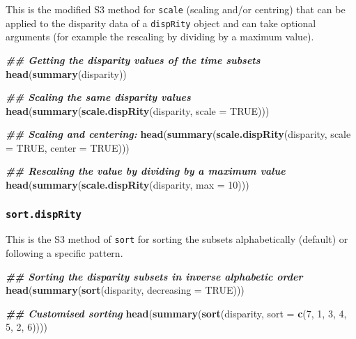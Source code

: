 \documentclass[
]{book}
\newenvironment{Shaded}{\begin{snugshade}}{\end{snugshade}}
\newcommand{\AttributeTok}[1]{\textcolor[rgb]{0.13,0.29,0.53}{#1}}
\newcommand{\ConstantTok}[1]{\textcolor[rgb]{0.56,0.35,0.01}{#1}}
\newcommand{\DecValTok}[1]{\textcolor[rgb]{0.00,0.00,0.81}{#1}}
\newcommand{\DocumentationTok}[1]{\textcolor[rgb]{0.56,0.35,0.01}{\textbf{\textit{#1}}}}
\newcommand{\FunctionTok}[1]{\textcolor[rgb]{0.13,0.29,0.53}{\textbf{#1}}}
\newcommand{\NormalTok}[1]{#1}
\begin{document}
This is the modified S3 method for \texttt{scale} (scaling and/or centring) that can be applied to the disparity data of a \texttt{dispRity} object and can take optional arguments (for example the rescaling by dividing by a maximum value).

\begin{Shaded}
\begin{Highlighting}[]
\DocumentationTok{\#\# Getting the disparity values of the time subsets}
\FunctionTok{head}\NormalTok{(}\FunctionTok{summary}\NormalTok{(disparity))}

\DocumentationTok{\#\# Scaling the same disparity values}
\FunctionTok{head}\NormalTok{(}\FunctionTok{summary}\NormalTok{(}\FunctionTok{scale.dispRity}\NormalTok{(disparity, }\AttributeTok{scale =} \ConstantTok{TRUE}\NormalTok{)))}

\DocumentationTok{\#\# Scaling and centering:}
\FunctionTok{head}\NormalTok{(}\FunctionTok{summary}\NormalTok{(}\FunctionTok{scale.dispRity}\NormalTok{(disparity, }\AttributeTok{scale =} \ConstantTok{TRUE}\NormalTok{, }\AttributeTok{center =} \ConstantTok{TRUE}\NormalTok{)))}

\DocumentationTok{\#\# Rescaling the value by dividing by a maximum value}
\FunctionTok{head}\NormalTok{(}\FunctionTok{summary}\NormalTok{(}\FunctionTok{scale.dispRity}\NormalTok{(disparity, }\AttributeTok{max =} \DecValTok{10}\NormalTok{)))}
\end{Highlighting}
\end{Shaded}

\hypertarget{sort.disprity}{%
\subsubsection{\texorpdfstring{\texttt{sort.dispRity}}{sort.dispRity}}\label{sort.disprity}}

This is the S3 method of \texttt{sort} for sorting the subsets alphabetically (default) or following a specific pattern.

\begin{Shaded}
\begin{Highlighting}[]
\DocumentationTok{\#\# Sorting the disparity subsets in inverse alphabetic order}
\FunctionTok{head}\NormalTok{(}\FunctionTok{summary}\NormalTok{(}\FunctionTok{sort}\NormalTok{(disparity, }\AttributeTok{decreasing =} \ConstantTok{TRUE}\NormalTok{)))}

\DocumentationTok{\#\# Customised sorting}
\FunctionTok{head}\NormalTok{(}\FunctionTok{summary}\NormalTok{(}\FunctionTok{sort}\NormalTok{(disparity, }\AttributeTok{sort =} \FunctionTok{c}\NormalTok{(}\DecValTok{7}\NormalTok{, }\DecValTok{1}\NormalTok{, }\DecValTok{3}\NormalTok{, }\DecValTok{4}\NormalTok{, }\DecValTok{5}\NormalTok{, }\DecValTok{2}\NormalTok{, }\DecValTok{6}\NormalTok{))))}
\end{Highlighting}
\end{Shaded}
\end{document}
